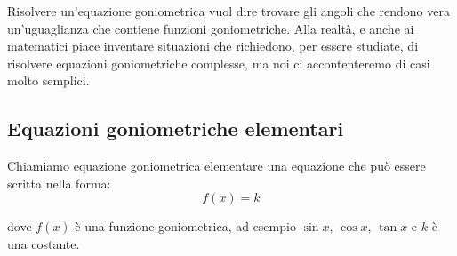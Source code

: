 Risolvere un'equazione goniometrica vuol dire trovare gli angoli che rendono 
vera un'uguaglianza che contiene funzioni goniometriche. 
Alla realtà, e anche ai matematici piace inventare situazioni che richiedono, 
per essere studiate, di risolvere equazioni goniometriche complesse, ma noi ci 
accontenteremo di casi molto semplici.

\subsection{Equazioni goniometriche elementari}

Chiamiamo equazione goniometrica elementare una equazione che può essere 
scritta nella forma:
\[f(x)=k\]

dove $f(x)$ è una funzione goniometrica, ad esempio $\sin x$, $\cos x$, 
$\tan x$ e $k$ è una costante.

